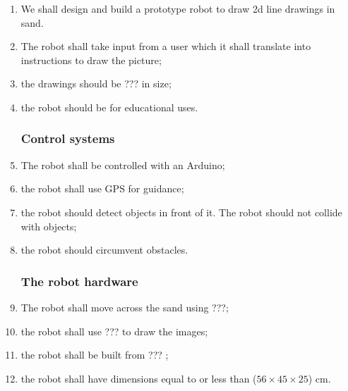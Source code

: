     \label{outline specification}
        \begin{enumerate} %
            \subsubsection{The project}
            \item We shall design and build a prototype robot to draw 2d line drawings in sand.\label{spec: draw}
            \item The robot shall take input from a user which it shall translate into instructions to draw the picture;\label{spec: take input}
            \item the drawings should be ???  in size; \label{spec: drawing size}
            \item the robot should be for educational uses. \label{spec: education}

            \subsubsection{Control systems}
            \item The robot shall be controlled with an Arduino; \label{spec: arduino}
            \item the robot shall use \gls{GPS} for guidance; \label{spec: gps}
            \item the robot should detect objects in front of it. The robot should not collide with objects; \label{spec: detect objects}
            \item the robot should circumvent obstacles.\label{spec: circumvent}

            \subsubsection{The robot hardware}
            \item The robot shall move across the sand using ???; \label{spec: movement}
            \item the robot shall use ???  to draw the images; \label{spec: tool}
            \item the robot shall be built from ??? ; \label{spec: material}
            \item the robot shall have dimensions equal to or less than ($56 \times 45 \times 25$) cm. \label{spec: robot size}


\end{enumerate}

